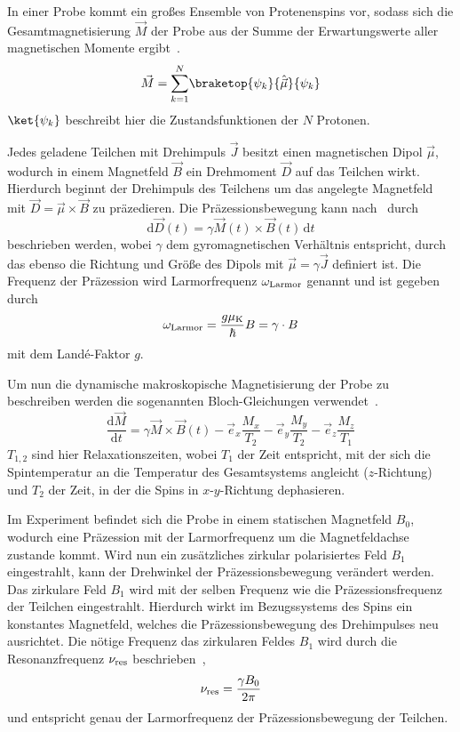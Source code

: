 \documentclass[paper=a4,
	fontsize=10pt,
	DIV=18,
	twocolumn,
	parskip=half
	]{scrartcl}
\numberwithin{equation}{section}    %
\begin{document}
In einer Probe kommt ein großes Ensemble von Protenenspins vor, sodass sich die Gesamtmagnetisierung $\vec{M}$ der Probe aus der Summe der Erwartungswerte aller magnetischen Momente ergibt~\citep{anleitung}.
\begin{equation}
	\vec{M} = \underset{k=1}{\overset{N}{\sum}} \braketop{\psi_k}{\hat{\vec{\mu}}}{\psi_k}
\end{equation}
$\ket{\psi_k}$ beschreibt hier die Zustandsfunktionen der $N$ Protonen.

Jedes geladene Teilchen mit Drehimpuls $\vec{J}$ besitzt einen magnetischen Dipol $\vec{\mu}$, wodurch in einem Magnetfeld $\vec{B}$ ein Drehmoment $\vec{D}$ auf das Teilchen wirkt. Hierdurch beginnt der Drehimpuls des Teilchens um das angelegte Magnetfeld mit $\vec{D} = \vec{\mu} \times \vec{B}$ zu präzedieren. Die Präzessionsbewegung kann nach~\citet{anleitung} durch
\begin{equation}
	\mathrm{d}\vec{D}(t) = \gamma\vec{M}(t) \times \vec{B}(t)\,\mathrm{d}t
\end{equation}
beschrieben werden, wobei $\gamma$ dem gyromagnetischen Verhältnis entspricht, durch das ebenso die Richtung und Größe des Dipols mit $\vec{\mu} = \gamma\vec{J}$ definiert ist.
Die Frequenz der Präzession wird Larmorfrequenz $\omega_{\rm Larmor}$ genannt und ist gegeben durch~\citep{mueller}
\begin{equation}
	\omega_{\rm Larmor} = \frac{g \mu_{\rm K}}{\hbar}B = \gamma \cdot B
\end{equation}
mit dem Landé-Faktor $g$.

Um nun die dynamische makroskopische Magnetisierung der Probe zu beschreiben werden die sogenannten Bloch-Gleichungen verwendet~\citep{anleitung}.
\begin{equation}
	\frac{\mathrm{d}\vec{M}}{\mathrm{d}t} = \gamma\vec{M} \times \vec{B}(t) - \vec{e}_x \frac{M_x}{T_2} - \vec{e}_y \frac{M_y}{T_2} - \vec{e}_z \frac{M_z}{T_1}
	\label{bloch}
\end{equation}
$T_{1,2}$ sind hier Relaxationszeiten, wobei $T_{1}$ der Zeit entspricht, mit der sich die Spintemperatur an die Temperatur des Gesamtsystems angleicht ($z$-Richtung) und $T_2$ der Zeit, in der die Spins in $x$-$y$-Richtung dephasieren.

Im Experiment befindet sich die Probe in einem statischen Magnetfeld $B_0$, wodurch eine Präzession mit der Larmorfrequenz um die Magnetfeldachse zustande kommt. Wird nun ein zusätzliches zirkular polarisiertes Feld $B_1$ eingestrahlt, kann der Drehwinkel der Präzessionsbewegung verändert werden. Das zirkulare Feld $B_1$ wird mit der selben Frequenz wie die Präzessionsfrequenz der Teilchen eingestrahlt. Hierdurch wirkt im Bezugssystems des Spins ein konstantes Magnetfeld, welches die Präzessionsbewegung des Drehimpulses neu ausrichtet. Die nötige Frequenz das zirkularen Feldes $B_1$ wird durch die Resonanzfrequenz $\nu_{\rm res}$ beschrieben~\citep{anleitung},
\begin{equation}
	\nu_{\rm res} = \frac{\gamma B_0}{2\pi}
\end{equation}
und entspricht genau der Larmorfrequenz der Präzessionsbewegung der Teilchen.
\end{document}
